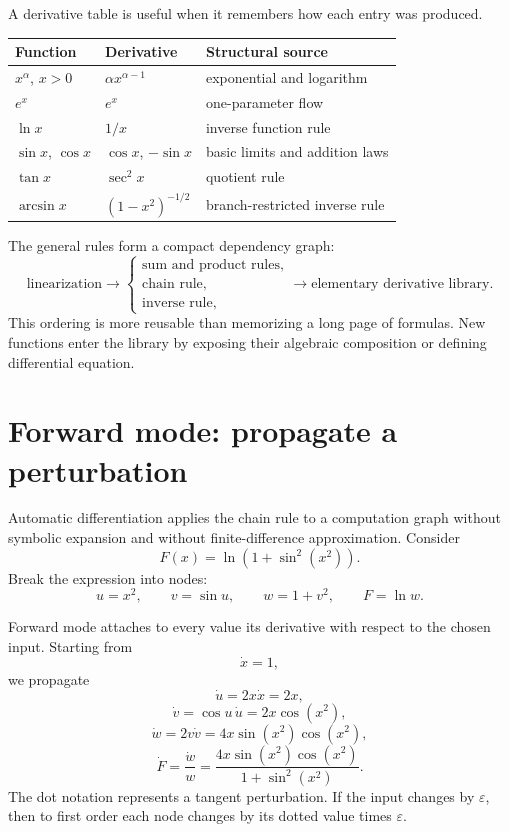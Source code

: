 A derivative table is useful when it remembers how each entry was produced.

\begin{center}
\small
\begin{tabularx}{\textwidth}{@{}lYY@{}}
\toprule
Function & Derivative & Structural source\\
\midrule
\(x^\alpha\), \(x>0\) & \(\alpha x^{\alpha-1}\) & exponential and logarithm\\
\(e^x\) & \(e^x\) & one-parameter flow\\
\(\ln x\) & \(1/x\) & inverse function rule\\
\(\sin x\), \(\cos x\) & \(\cos x\), \(-\sin x\) & basic limits and addition laws\\
\(\tan x\) & \(\sec^2x\) & quotient rule\\
\(\arcsin x\) & \((1-x^2)^{-1/2}\) & branch-restricted inverse rule\\
\bottomrule
\end{tabularx}
\end{center}

The general rules form a compact dependency graph:
\[
  \text{linearization}
  \longrightarrow
  \begin{cases}
    \text{sum and product rules},\\
    \text{chain rule},\\
    \text{inverse rule},
  \end{cases}
  \longrightarrow
  \text{elementary derivative library}.
\]
This ordering is more reusable than memorizing a long page of formulas.  New functions enter the library by exposing their algebraic composition or defining differential equation.

\section{Forward mode: propagate a perturbation}

Automatic differentiation applies the chain rule to a computation graph without symbolic expansion and without finite-difference approximation.  Consider
\[
  F(x)=\ln\left(1+\sin^2(x^2)\right).
\]
Break the expression into nodes:
\[
  u=x^2,
  \qquad
  v=\sin u,
  \qquad
  w=1+v^2,
  \qquad
  F=\ln w.
\]

Forward mode attaches to every value its derivative with respect to the chosen input.  Starting from
\[
  \dot x=1,
\]
we propagate
\[
  \dot u=2x\dot x=2x,
\]
\[
  \dot v=\cos u\,\dot u=2x\cos(x^2),
\]
\[
  \dot w=2v\dot v
  =4x\sin(x^2)\cos(x^2),
\]
\[
  \dot F=\frac{\dot w}{w}
  =\frac{4x\sin(x^2)\cos(x^2)}
  {1+\sin^2(x^2)}.
\]
The dot notation represents a tangent perturbation.  If the input changes by \(\varepsilon\), then to first order each node changes by its dotted value times \(\varepsilon\).

